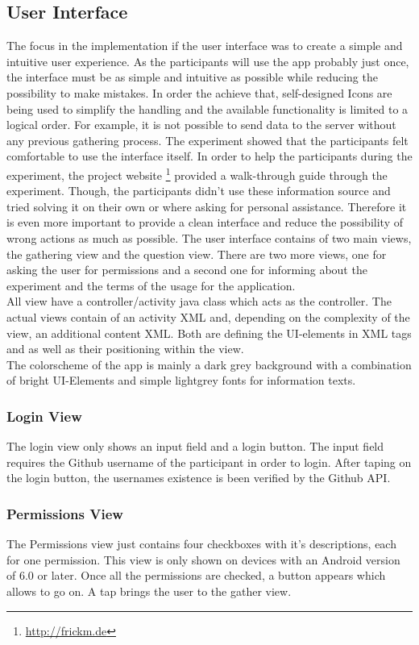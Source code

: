 \subsection{User Interface}
The focus in the implementation if the user interface was to create a simple and intuitive user experience. As the participants will use the app probably just once, the interface must be as simple and intuitive as possible while reducing the possibility to make mistakes. In order the achieve that, self-designed Icons are being used to simplify the handling and the available functionality is limited to a logical order. For example, it is not possible to send data to the server without any previous gathering process.
The experiment showed that the participants felt comfortable to use the interface itself. In order to help the participants during the experiment, the project website \footnote{\url{http://frickm.de}} provided a walk-through guide through the experiment. Though, the participants didn't use these information source and tried solving it on their own or where asking for personal assistance. Therefore it is even more important to provide a clean interface and reduce the possibility of wrong actions as much as possible. 
\bigbreak
The user interface contains of two main views, the gathering view and the question view. There are two more views, one for asking the user for permissions and a second one for informing about the experiment and the terms of the usage for the application. \\
All view have a controller/activity java class which acts as the controller. The actual views contain of an activity XML and, depending on the complexity of the view, an additional content XML. Both are defining the UI-elements in XML tags and as well as their positioning within the view. \\
The colorscheme of the app is mainly a dark grey background with a combination of bright UI-Elements and simple lightgrey fonts for information texts.

\subsubsection{Login View}
The login view only shows an input field and a login button. The input field requires the Github username of the participant in order to login. After taping on the login button, the usernames 	existence  is been verified by the Github API. 

\subsubsection{Permissions View}
The Permissions view just contains four checkboxes with it's descriptions, each for one permission. This view is only shown on devices with an Android version of 6.0 or later. 
Once all the permissions are checked, a button appears which allows to go on. A tap brings the user to the gather view.

